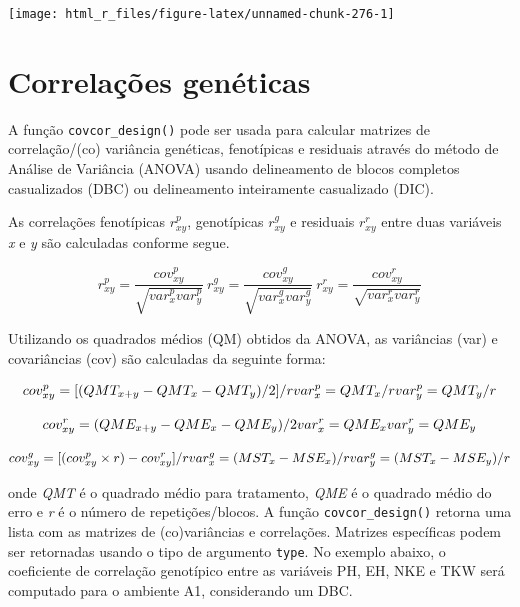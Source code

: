\documentclass[
]{book}
\makeatletter
\numberwithin{equation}{section}
\newcommand{\indf}[1]{\index[function]{#1@\texttt{#1()}|ST}}
\makeatother
\begin{document}
\begin{center}\texttt{[image: html\_r\_files/figure-latex/unnamed-chunk-276-1]} \end{center}

\hypertarget{correlauxe7uxf5es-genuxe9ticas}{%
\section{Correlações genéticas}\label{correlauxe7uxf5es-genuxe9ticas}}

A função \texttt{covcor\_design()} pode ser usada para calcular matrizes de correlação/(co) variância genéticas, fenotípicas e residuais através do método de Análise de Variância (ANOVA) usando delineamento de blocos completos casualizados (DBC) ou delineamento inteiramente casualizado (DIC).

As correlações fenotípicas \(r^p_{xy}\), genotípicas \(r^g_{xy}\) e residuais \(r^r_{xy}\) entre duas variáveis \emph{x} e \emph{y} são calculadas conforme segue.

\[
r^p_{xy} = \frac{cov^p_{xy}}{\sqrt{var^p_{x}var^p_{y}}} \
r^g_{xy} = \frac{cov^g_{xy}}{\sqrt{var^g_{x}var^g_{y}}} \
r^r_{xy} = \frac{cov^r_{xy}}{\sqrt{var^r_{x}var^r_{y}}}
\]

Utilizando os quadrados médios (QM) obtidos da ANOVA, as variâncias (var) e covariâncias (cov) são calculadas da seguinte forma:

\[
cov^p_{xy} = [(QMT_{x+y} -QMT_x -QMT_y)/2]/r \\
var^p_x =QMT_x / r \\
var^p_y =QMT_y / r
\]

\[
cov^r_{xy} = (QME_{x+y} - QME_x - QME_y)/2 \\
var^r_x = QME_x \\
var^r_y = QME_y
\]

\[
cov^g_{xy} = [(cov^p_{xy} \times r) - cov^r_{xy}]/r \\
var^g_x = (MST_x - MSE_x)/r \\
var^g_y = (MST_x - MSE_y)/r
\]

onde \emph{QMT} é o quadrado médio para tratamento, \emph{QME} é o quadrado médio do erro e \emph{r} é o número de repetições/blocos. A função \texttt{covcor\_design()} \indf{covcor\_design} retorna uma lista com as matrizes de (co)variâncias e correlações. Matrizes específicas podem ser retornadas usando o tipo de argumento \texttt{type}. No exemplo abaixo, o coeficiente de correlação genotípico entre as variáveis PH, EH, NKE e TKW será computado para o ambiente A1, considerando um DBC.
\end{document}
